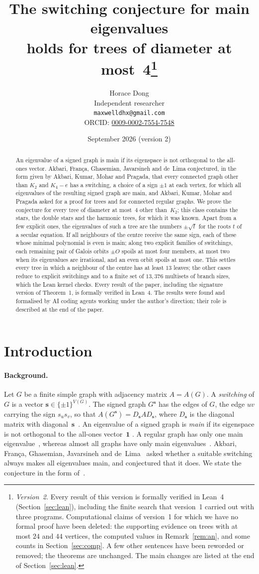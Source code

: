 \documentclass[11pt]{article}
\title{The switching conjecture for main eigenvalues\\ holds for trees of diameter at
most~4\thanks{\emph{Version~2.} Every result of this version is formally verified in Lean~4
(Section~\ref{sec:lean}), including the finite search that version~1 carried out with three
programs. Computational claims of version~1 for which we have no formal proof have been deleted:
the supporting evidence on trees with at most $24$ and $44$ vertices, the computed values in
Remark~\ref{rem:an}, and some counts in Section~\ref{sec:comp}. A few other sentences have been
reworded or removed; the theorems are unchanged. The main changes are listed at the end of
Section~\ref{sec:lean}.}}
\author{Horace Dong\\ \small Independent researcher\\
\small\texttt{maxwelldhx@gmail.com}\\
\small ORCID: \href{https://orcid.org/0009-0002-7554-7548}{0009-0002-7554-7548}}
\date{September 2026 (version 2)}
\numberwithin{equation}{section}
\theoremstyle{remark}
\newcommand{\s}{\mathbf s}
\newcommand{\one}{\mathbf 1}
\begin{document}
\maketitle
\begin{abstract}
An eigenvalue of a signed graph is main if its eigenspace is not orthogonal
to the all-ones vector. Akbari, Fran\c{c}a, Ghasemian, Javarsineh and de~Lima
conjectured, in the form given by Akbari, Kumar, Mohar and Pragada, that every
connected graph other than $K_2$ and $K_4-e$ has a
switching, a choice of a sign $\pm1$ at each vertex, for which all eigenvalues
of the resulting signed graph are main, and Akbari, Kumar, Mohar and Pragada
asked for a proof for trees and for connected regular graphs. We prove the
conjecture for every tree of diameter at most~$4$ other than~$K_2$; this class
contains the stars, the double stars and the harmonic trees, for which it was
known. Apart from a few explicit ones, the eigenvalues of such a tree are the
numbers $\pm\sqrt t$ for the roots $t$ of a secular equation. If all neighbours of the
centre receive the same sign, each of these whose minimal polynomial is even is
main; along two explicit families of switchings, each
remaining pair of Galois orbits $\pm O$ spoils at most four members, at most two
when its eigenvalues are irrational, and an even orbit spoils at most one. This settles every tree in which a neighbour of the centre has
at least $13$ leaves; the other cases reduce to explicit switchings and to a
finite set of $13{,}376$ multisets of branch sizes, which the Lean kernel
checks. Every result of
the paper, including the signature version of Theorem~1, is formally verified
in Lean~4. The results were found and formalised by AI coding agents working
under the author's direction; their role is described at the end of the
paper.
\end{abstract}

\section{Introduction}

\paragraph{Background.}
Let $G$ be a finite simple graph with adjacency matrix $A=A(G)$. A
\emph{switching} of $G$ is a vector $\s\in\{\pm1\}^{V(G)}$. The signed graph
$G^{\s}$ has the edges of $G$, the edge $uv$ carrying the sign $s_us_v$, so
that $A(G^{\s})=D_{\s}AD_{\s}$, where $D_{\s}$ is the diagonal matrix with
diagonal~$\s$~\cite{akmp}. An eigenvalue of a signed graph is \emph{main} if
its eigenspace is not orthogonal to the all-ones vector~$\one$
\cite{cve78,row07}. A regular graph has only one main eigenvalue~\cite{row07},
whereas almost all graphs have only main eigenvalues~\cite{ort}. Akbari, Fran\c{c}a,
Ghasemian, Javarsineh and de~Lima~\cite{afgjl} asked whether a suitable
switching always makes all eigenvalues main, and conjectured that it does. We
state the conjecture in the form of~\cite[Conjecture~1.1]{akmp}.
\end{document}
